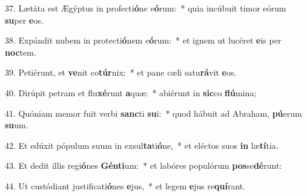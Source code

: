 37. Lætáta est Ægýptus in profecti\textbf{ó}ne e\textbf{ó}rum:~*  quia incúbuit timor eórum \textbf{su}per \textbf{e}os.\

38. Expándit nubem in protecti\textbf{ó}nem e\textbf{ó}rum:~*  et ignem ut lucéret \textbf{e}is per \textbf{noc}tem.\

39. Petiérunt, et \textbf{ve}nit co\textbf{túr}nix:~*  et pane cæli satu\textbf{rá}vit \textbf{e}os.\

40. Dirúpit petram et flu\textbf{xé}runt \textbf{a}quæ:~*  abiérunt in \textbf{sic}co \textbf{flú}mina;\

41. Quóniam memor fuit verbi \textbf{sanc}ti \textbf{su}i:~*  quod hábuit ad Abraham, \textbf{pú}erum \textbf{su}um.\

42. Et edúxit pópulum suum in exsul\textbf{ta}ti\textbf{ó}ne,~*  et eléctos suos \textbf{in} læ\textbf{tí}tia.\

43. Et dedit illis regi\textbf{ó}nes \textbf{Gén}\textbf{ti}um:~*  et labóres populórum \textbf{pos}se\textbf{dé}runt:\

44. Ut custódiant justificati\textbf{ó}nes \textbf{e}jus,~*  et legem \textbf{e}jus re\textbf{quí}rant.\

